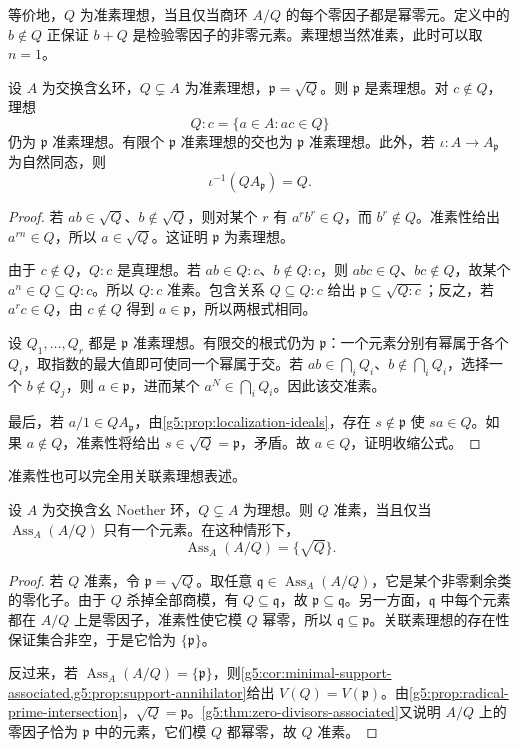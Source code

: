 等价地，\(Q\) 为准素理想，当且仅当商环 \(A/Q\) 的每个零因子都是幂零元。定义中的 \(b\notin Q\) 正保证 \(b+Q\) 是检验零因子的非零元素。素理想当然准素，此时可以取 \(n=1\)。

\begin{lemma}\label{g5:lem:primary-ideal-properties}
	设 \(A\) 为交换含幺环，\(Q\subsetneq A\) 为准素理想，\(\mathfrak p=\sqrt Q\)。则 \(\mathfrak p\) 是素理想。对 \(c\notin Q\)，理想
	\[
		Q:c=\{a\in A:ac\in Q\}
	\]
	仍为 \(\mathfrak p\) 准素理想。有限个 \(\mathfrak p\) 准素理想的交也为 \(\mathfrak p\) 准素理想。此外，若 \(\iota:A\to A_{\mathfrak p}\) 为自然同态，则
	\[
		\iota^{-1}(QA_{\mathfrak p})=Q.
	\]
\end{lemma}
\begin{proof}
	若 \(ab\in\sqrt Q\)、\(b\notin\sqrt Q\)，则对某个 \(r\) 有 \(a^rb^r\in Q\)，而 \(b^r\notin Q\)。准素性给出 \(a^{rn}\in Q\)，所以 \(a\in\sqrt Q\)。这证明 \(\mathfrak p\) 为素理想。

	由于 \(c\notin Q\)，\(Q:c\) 是真理想。若 \(ab\in Q:c\)、\(b\notin Q:c\)，则 \(abc\in Q\)、\(bc\notin Q\)，故某个 \(a^n\in Q\subseteq Q:c\)。所以 \(Q:c\) 准素。包含关系 \(Q\subseteq Q:c\) 给出 \(\mathfrak p\subseteq\sqrt{Q:c}\)；反之，若 \(a^r c\in Q\)，由 \(c\notin Q\) 得到 \(a\in\mathfrak p\)，所以两根式相同。

	设 \(Q_1,\ldots,Q_r\) 都是 \(\mathfrak p\) 准素理想。有限交的根式仍为 \(\mathfrak p\)：一个元素分别有幂属于各个 \(Q_i\)，取指数的最大值即可使同一个幂属于交。若 \(ab\in\bigcap_iQ_i\)、\(b\notin\bigcap_iQ_i\)，选择一个 \(b\notin Q_j\)，则 \(a\in\mathfrak p\)，进而某个 \(a^N\in\bigcap_iQ_i\)。因此该交准素。

	最后，若 \(a/1\in QA_{\mathfrak p}\)，由\cref{g5:prop:localization-ideals}，存在 \(s\notin\mathfrak p\) 使 \(sa\in Q\)。如果 \(a\notin Q\)，准素性将给出 \(s\in\sqrt Q=\mathfrak p\)，矛盾。故 \(a\in Q\)，证明收缩公式。
\end{proof}

准素性也可以完全用关联素理想表述。

\begin{proposition}\label{g5:prop:primary-associated-singleton}
	设 \(A\) 为交换含幺 Noether 环，\(Q\subsetneq A\) 为理想。则 \(Q\) 准素，当且仅当 \(\operatorname{Ass}_A(A/Q)\) 只有一个元素。在这种情形下，
	\[
		\operatorname{Ass}_A(A/Q)=\{\sqrt Q\}.
	\]
\end{proposition}
\begin{proof}
	若 \(Q\) 准素，令 \(\mathfrak p=\sqrt Q\)。取任意 \(\mathfrak q\in\operatorname{Ass}_A(A/Q)\)，它是某个非零剩余类的零化子。由于 \(Q\) 杀掉全部商模，有 \(Q\subseteq\mathfrak q\)，故 \(\mathfrak p\subseteq\mathfrak q\)。另一方面，\(\mathfrak q\) 中每个元素都在 \(A/Q\) 上是零因子，准素性使它模 \(Q\) 幂零，所以 \(\mathfrak q\subseteq\mathfrak p\)。关联素理想的存在性保证集合非空，于是它恰为 \(\{\mathfrak p\}\)。

	反过来，若 \(\operatorname{Ass}_A(A/Q)=\{\mathfrak p\}\)，则\cref{g5:cor:minimal-support-associated,g5:prop:support-annihilator}给出 \(V(Q)=V(\mathfrak p)\)。由\cref{g5:prop:radical-prime-intersection}，\(\sqrt Q=\mathfrak p\)。\cref{g5:thm:zero-divisors-associated}又说明 \(A/Q\) 上的零因子恰为 \(\mathfrak p\) 中的元素，它们模 \(Q\) 都幂零，故 \(Q\) 准素。
\end{proof}

